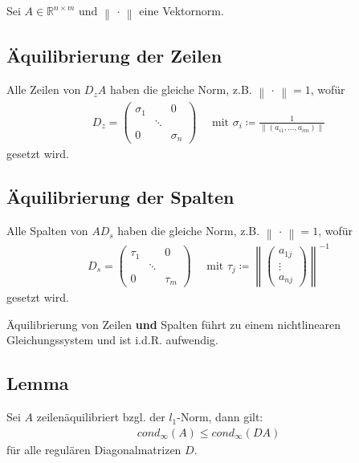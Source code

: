 \documentclass[ngerman,fontsize=11pt, paper=a4, parskip=half, titlepage=true, toc=bib]{scrbook}
\newcommand{\Renm}{\mathds{R}^{n\times m}}
\newcommand{\nn}[1]{\left\| #1 \right\|}
\begin{document}
  Sei $A\in\Renm $ und $\nn{\,\cdot\,} $ eine Vektornorm.
  
  
  \subsection{Äquilibrierung der Zeilen} 
  Alle Zeilen von $D_zA$ haben die gleiche Norm, z.B. $\nn{\,\cdot\,} =1$, wofür 
  \begin{gather}
    D_z = \begin{pmatrix}
      \sigma_1 & & 0 \\
      &\ddots & \\ 
      0 && \sigma_n
    \end{pmatrix}
    \quad \text{ mit }\sigma_i\coloneqq \frac{1}{\nn{(a_{i1}, \dots , a_{im})}}
    \label{IV.1.1}
  \end{gather}
  gesetzt wird.


\subsection{Äquilibrierung der Spalten} 
  Alle Spalten von $AD_s$ haben die gleiche Norm, z.B. $\nn{\,\cdot\,} =1$, wofür 
  \begin{gather}
    D_s = \begin{pmatrix}
      \tau_1 & & 0 \\
      &\ddots & \\ 
      0 && \tau_m
    \end{pmatrix}
    \quad \text{ mit }\tau_j\coloneqq \nn{\begin{pmatrix}
        a_{1j} \\ \vdots \\ a_{nj}
      \end{pmatrix}}^{-1}
    \label{IV.1.2}
  \end{gather}
  gesetzt wird.
  
  Äquilibrierung von Zeilen \textbf{und} Spalten führt zu einem nichtlinearen Gleichungssystem und ist i.d.R. aufwendig.
  
  
  \subsection{Lemma} \label{4.3.1}
  Sei $A$ zeilenäquilibriert bzgl. der $l_1$-Norm, dann gilt:
  \begin{gather}
    cond_{\infty}(A) \leq cond_{\infty}(DA)  \label{IV.1.3}
  \end{gather}
  für alle regulären Diagonalmatrizen $D$.
  
\end{document}
